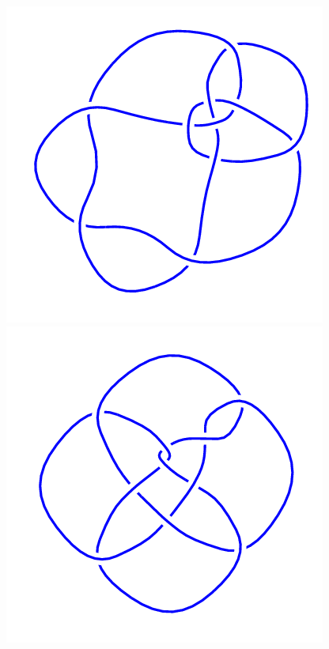 \begin{figure}[H]
\begin{minipage}[b]{.18\linewidth}
	\end{minipage}
	\begin{minipage}[b]{.18\linewidth}
		\centering
		\includegraphics[width=\linewidth]{../data/10_114.png}
	\end{minipage}
	\begin{minipage}[b]{.18\linewidth}
		\centering
		\includegraphics[width=\linewidth]{../data/10_115.png}

\end{minipage}
\end{figure}
